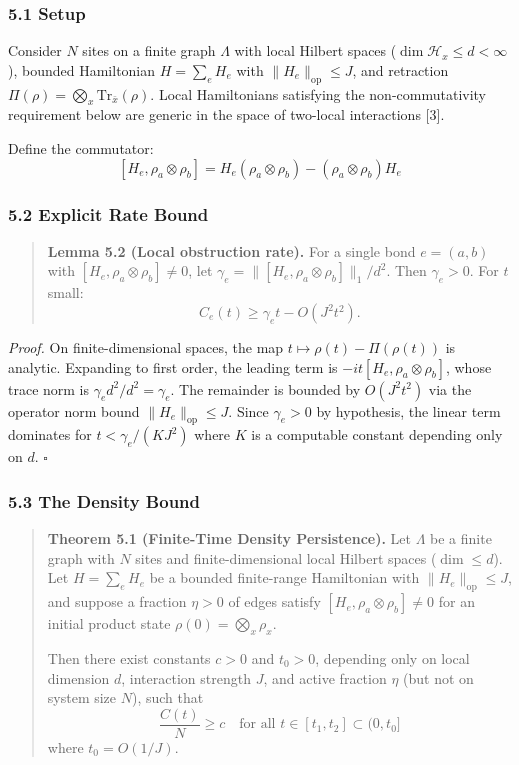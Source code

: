 \documentclass[
]{article}
\begin{document}
\subsubsection{5.1 Setup}\label{setup}

Consider \(N\) sites on a finite graph \(\Lambda\) with local Hilbert
spaces (\(\dim \mathcal{H}_x \leq d < \infty\)), bounded Hamiltonian
\(H = \sum_e H_e\) with \(\|H_e\|_{\text{op}} \leq J\), and retraction
\(\Pi(\rho) = \bigotimes_x \text{Tr}_{\bar{x}}(\rho)\). Local
Hamiltonians satisfying the non-commutativity requirement below are
generic in the space of two-local interactions {[}3{]}.

Define the commutator:
\[[H_e, \rho_a \otimes \rho_b] = H_e(\rho_a \otimes \rho_b) - (\rho_a \otimes \rho_b)H_e\]

\subsubsection{5.2 Explicit Rate Bound}\label{explicit-rate-bound}

\begin{quote}
\textbf{Lemma 5.2 (Local obstruction rate).} For a single bond
\(e = (a,b)\) with \([H_e, \rho_a \otimes \rho_b] \neq 0\), let
\(\gamma_e = \|[H_e, \rho_a \otimes \rho_b]\|_1 / d^2\). Then
\(\gamma_e > 0\). For \(t\) small:
\[C_e(t) \geq \gamma_e t - O(J^2 t^2).\]
\end{quote}

\emph{Proof.} On finite-dimensional spaces, the map
\(t \mapsto \rho(t) - \Pi(\rho(t))\) is analytic. Expanding to first
order, the leading term is \(-it[H_e, \rho_a \otimes \rho_b]\), whose
trace norm is \(\gamma_e d^2 / d^2 = \gamma_e\). The remainder is
bounded by \(O(J^2 t^2)\) via the operator norm bound
\(\|H_e\|_{\text{op}} \leq J\). Since \(\gamma_e > 0\) by hypothesis,
the linear term dominates for \(t < \gamma_e / (KJ^2)\) where \(K\) is a
computable constant depending only on \(d\). \(\square\)

\subsubsection{5.3 The Density Bound}\label{the-density-bound}

\begin{quote}
\textbf{Theorem 5.1 (Finite-Time Density Persistence).} Let \(\Lambda\)
be a finite graph with \(N\) sites and finite-dimensional local Hilbert
spaces (\(\dim \leq d\)). Let \(H = \sum_e H_e\) be a bounded
finite-range Hamiltonian with \(\|H_e\|_{\text{op}} \leq J\), and
suppose a fraction \(\eta > 0\) of edges satisfy
\([H_e, \rho_a \otimes \rho_b] \neq 0\) for an initial product state
\(\rho(0) = \bigotimes_x \rho_x\).

Then there exist constants \(c > 0\) and \(t_0 > 0\), depending only on
local dimension \(d\), interaction strength \(J\), and active fraction
\(\eta\) (but not on system size \(N\)), such that
\[\frac{C(t)}{N} \geq c \quad \text{for all } t \in [t_1, t_2] \subset (0, t_0]\]
where \(t_0 = O(1/J)\).
\end{quote}
\end{document}
